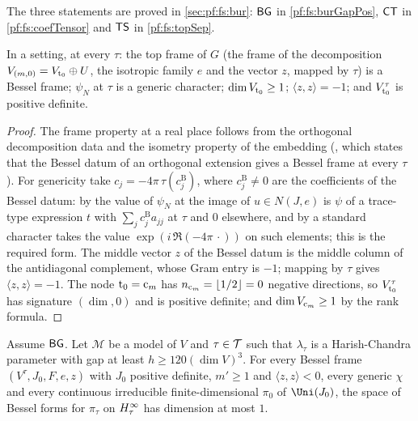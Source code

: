 The three statements are proved in \cref{sec:pf:fs:bur}: $\mathsf{BG}$ in \cref{pf:fs:burGapPos}, $\mathsf{CT}$ in \cref{pf:fs:coefTensor}
and $\mathsf{TS}$ in \cref{pf:fs:topSep}.

\begin{lemma}\label{pf:fs:topCfg}
In a setting, at every $\tau$: the top frame of $G$ (the frame of the decomposition $V_{(m,0)}=V_{\mathrm{t}_0}\oplus U$, the isotropic
family $e$ and the vector $z$, mapped by $\tau$) is a Bessel frame; $\psi_N$ at $\tau$ is a generic character; $\dim V_{\mathrm{t}_0}\ge1$;
$\langle z,z\rangle=-1$; and $V_{\mathrm{t}_0}^\tau$ is positive definite.
\end{lemma}

\begin{proof}
The frame property at a real place follows from the orthogonal decomposition data and the isometry property of the embedding
(, which states that the Bessel datum of an orthogonal
extension gives a Bessel frame at every $\tau$). For genericity take $c_j=-4\pi\,\tau(c^{\mathrm{B}}_j)$, where $c^{\mathrm B}_j\ne0$
are the coefficients of the Bessel datum: by  the value of
$\psi_N$ at the image of $u\in N(J,e)$ is $\psi$ of a trace-type expression $t$ with $\sum_jc^{\mathrm B}_ja_{jj}$ at $\tau$ and $0$
elsewhere, and by  a standard character takes the value
$\exp(i\,\Re(-4\pi\,\cdot))$ on such elements; this is the required form. The middle vector $z$ of the Bessel datum is the
middle column of the antidiagonal complement, whose Gram entry is $-1$; mapping by $\tau$ gives $\langle z,z\rangle=-1$. The
node $\mathrm{t}_0=\mathrm{c}_m$ has $n_{\mathrm{c}_m}=\lfloor1/2\rfloor=0$ negative directions, so $V_{\mathrm{t}_0}^\tau$ has signature $(\dim,0)$ and
is positive definite; and $\dim V_{\mathrm{c}_m}\ge1$ by the rank formula.
\end{proof}

\begin{lemma}\label{pf:fs:burGapModel}
Assume $\mathsf{BG}$. Let $\mathcal M$ be a model of $V$ and $\tau\in\mathcal T$ such that $\lambda_\tau$ is a Harish-Chandra parameter
with gap at least $h\ge120(\dim V)^3$. For every Bessel frame $(V^\tau,J_0,F,e,z)$ with $J_0$ positive definite, $m'\ge1$ and
$\langle z,z\rangle<0$, every generic $\chi$ and every continuous irreducible finite-dimensional $\pi_0$ of $\Uni(J_0)$, the space
of Bessel forms for $\pi_\tau$ on $H^{\infty}_\tau$ has dimension at most $1$.
\end{lemma}

